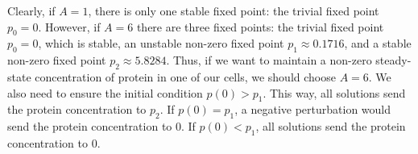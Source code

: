 \documentclass[12pt]{article}
\begin{document}
Clearly, if $A = 1$, there is only one stable fixed point: the trivial fixed point $p_0 = 0$.  However, if $A = 6$ there are three fixed points: the trivial fixed point $p_0 = 0$, which is stable, an unstable non-zero fixed point $p_1 \approx 0.1716$, and a stable non-zero fixed point $p_2 \approx 5.8284$.  Thus, if we want to maintain a non-zero steady-state concentration of protein in one of our cells, we should choose $A = 6$.  We also need to ensure the initial condition $p(0) > p_1$.  This way, all solutions send the protein concentration to $p_2$.  If $p(0) = p_1$, a negative perturbation would send the protein concentration to $0$.  If $p(0) < p_1$, all solutions send the protein concentration to $0$.
\end{document}
